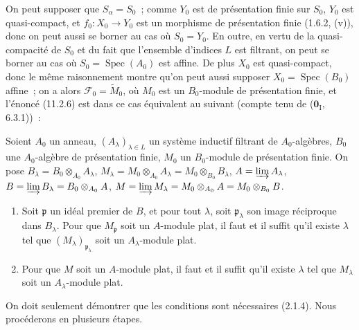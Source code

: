 On peut supposer que $S_\alpha=S_0$~; comme $Y_0$ est de présentation finie
sur $S_0$, $Y_0$ est quasi-compact, et $f_0:X_0\to Y_0$ est un morphisme de
présentation finie (1.6.2, (v)), donc on peut aussi se borner au cas où
$S_0=Y_0$. En outre, en vertu de la quasi-compacité de $S_0$ et du fait que
l'ensemble d'indices $L$ est filtrant, on peut se borner au cas où
$S_0=\operatorname{Spec}(A_0)$ est affine. De plus $X_0$ est quasi-compact,
donc le même raisonnement montre qu'on peut aussi supposer
$X_0=\operatorname{Spec}(B_0)$ affine~; on a alors
$\mathcal F_0=\widetilde M_0$, où $M_0$ est un $B_0$-module de présentation
finie, et l'énoncé (11.2.6) est dans ce cas équivalent au suivant (compte tenu
de ($\mathbf 0_{\mathrm I}$, 6.3.1))~:

\begin{corollary}[11.2.6.1]
\label{IV.11.2.6.1-fr}
Soient $A_0$ un anneau, $(A_\lambda)_{\lambda\in L}$ un système inductif
filtrant de $A_0$-algèbres, $B_0$ une $A_0$-algèbre de présentation finie,
$M_0$ un $B_0$-module de présentation finie. On pose
$B_\lambda=B_0\otimes_{A_0}A_\lambda$,
$M_\lambda=M_0\otimes_{A_0}A_\lambda=M_0\otimes_{B_0}B_\lambda$,
$A=\varinjlim A_\lambda$, $B=\varinjlim B_\lambda=B_0\otimes_{A_0}A$,
$M=\varinjlim M_\lambda=M_0\otimes_{A_0}A=M_0\otimes_{B_0}B$.
\begin{enumerate}[label=\emph{(\roman*)}]
\item Soit $\mathfrak p$ un idéal premier de $B$, et pour tout $\lambda$,
soit $\mathfrak p_\lambda$ son image réciproque dans $B_\lambda$. Pour que
$M_{\mathfrak p}$ soit un $A$-module plat, il faut et il suffit qu'il existe
$\lambda$ tel que $(M_\lambda)_{\mathfrak p_\lambda}$ soit un
$A_\lambda$-module plat.
\item Pour que $M$ soit un $A$-module plat, il faut et il suffit qu'il existe
$\lambda$ tel que $M_\lambda$ soit un $A_\lambda$-module plat.
\end{enumerate}
\end{corollary}

On doit seulement démontrer que les conditions sont nécessaires (2.1.4).
Nous procéderons en plusieurs étapes.


